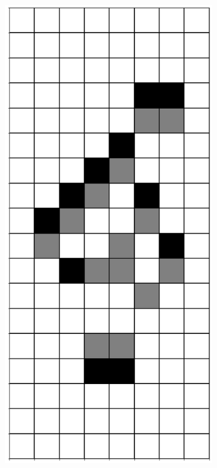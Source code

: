 \documentclass[12pt]{article}
\numberwithin{figure}{section} %
\begin{document}
\begin{figure}[H]
\begin{subfigure}{0.19\textwidth}
     \subcaption{}
   \end{subfigure}
        \begin{subfigure}{0.19\textwidth}
     \centering
     \includegraphics[width=\linewidth]{Section4/27.2}

\end{subfigure}
\end{figure}
\end{document}
